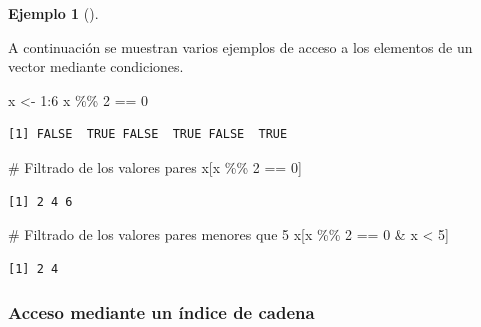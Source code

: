 \documentclass[
  a4paper,
]{scrreport}
\newenvironment{Shaded}{\begin{snugshade}}{\end{snugshade}}
\newcommand{\CommentTok}[1]{\textcolor[rgb]{0.37,0.37,0.37}{#1}}
\newcommand{\DecValTok}[1]{\textcolor[rgb]{0.68,0.00,0.00}{#1}}
\newcommand{\NormalTok}[1]{\textcolor[rgb]{0.00,0.23,0.31}{#1}}
\newcommand{\OtherTok}[1]{\textcolor[rgb]{0.00,0.23,0.31}{#1}}
\newcommand{\SpecialCharTok}[1]{\textcolor[rgb]{0.37,0.37,0.37}{#1}}
\theoremstyle{definition}
\newtheorem{example}{Ejemplo}[chapter]
\theoremstyle{definition}
\theoremstyle{remark}
\begin{document}
\leavevmode{}%
\begin{example}[]\label{exm-filtros}

A continuación se muestran varios ejemplos de acceso a los elementos de
un vector mediante condiciones.

\begin{Shaded}
\begin{Highlighting}[]
\NormalTok{x }\OtherTok{\textless{}{-}} \DecValTok{1}\SpecialCharTok{:}\DecValTok{6}
\NormalTok{x }\SpecialCharTok{\%\%} \DecValTok{2} \SpecialCharTok{==} \DecValTok{0}
\end{Highlighting}
\end{Shaded}

\begin{verbatim}
[1] FALSE  TRUE FALSE  TRUE FALSE  TRUE
\end{verbatim}

\begin{Shaded}
\begin{Highlighting}[]
\CommentTok{\# Filtrado de los valores pares}
\NormalTok{x[x }\SpecialCharTok{\%\%} \DecValTok{2} \SpecialCharTok{==} \DecValTok{0}\NormalTok{]}
\end{Highlighting}
\end{Shaded}

\begin{verbatim}
[1] 2 4 6
\end{verbatim}

\begin{Shaded}
\begin{Highlighting}[]
\CommentTok{\# Filtrado de los valores pares menores que 5}
\NormalTok{x[x }\SpecialCharTok{\%\%} \DecValTok{2} \SpecialCharTok{==} \DecValTok{0} \SpecialCharTok{\&}\NormalTok{ x }\SpecialCharTok{\textless{}} \DecValTok{5}\NormalTok{]}
\end{Highlighting}
\end{Shaded}

\begin{verbatim}
[1] 2 4
\end{verbatim}

\end{example}

\hypertarget{acceso-mediante-un-uxedndice-de-cadena}{%
\subsubsection{Acceso mediante un índice de
cadena}\label{acceso-mediante-un-uxedndice-de-cadena}}
\end{document}
